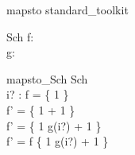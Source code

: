 \begin{zsection}
\SECTION mapsto \parents standard\_toolkit 
\end{zsection}

\begin{schema}{Sch}
f: \nat \pfun \nat\\
g: \nat \pfun \nat
\end{schema}

\begin{schema}{mapsto\_Sch}
    \Delta Sch \\ 
    i? : \nat
\where
    f = \{ 1  \} \\
    f' = \{ 1  + 1 \} \\
    f' = \{ 1 \mapsto g(i?) + 1 \} \\
    f' = f \oplus \{ 1 \mapsto g(i?) + 1 \}
\end{schema}

